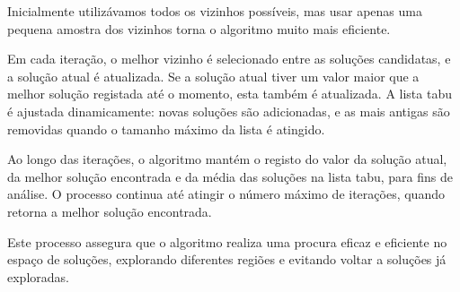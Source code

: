 Inicialmente utilizávamos todos os vizinhos possíveis, mas usar apenas uma pequena amostra dos vizinhos torna o algoritmo muito mais eficiente.

Em cada iteração, o melhor vizinho é selecionado entre as soluções candidatas, e a solução atual é atualizada. Se a solução atual tiver um valor maior que a melhor solução registada até o momento, esta também é atualizada. A lista tabu é ajustada dinamicamente: novas soluções são adicionadas, e as mais antigas são removidas quando o tamanho máximo da lista é atingido.

Ao longo das iterações, o algoritmo mantém o registo do valor da solução atual, da melhor solução encontrada e da média das soluções na lista tabu, para fins de análise. O processo continua até atingir o número máximo de iterações, quando retorna a melhor solução encontrada.

Este processo assegura que o algoritmo realiza uma procura eficaz e eficiente no espaço de soluções, explorando diferentes regiões e evitando voltar a soluções já exploradas.



